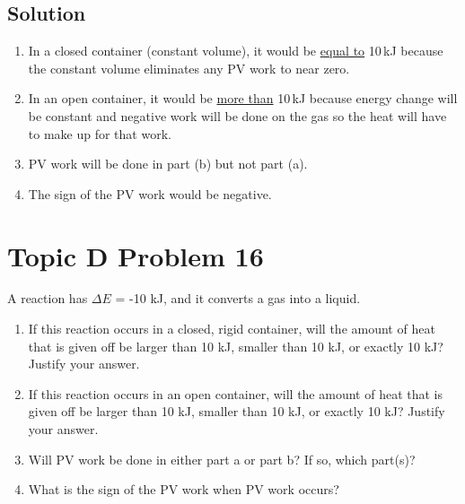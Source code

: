 \documentclass[10pt]{article}
\begin{document}
        \subsection{Solution}
        \begin{enumerate}[label=\alph*/]
            \item   In a closed container (constant volume), it would be \underline{equal to} 10\,\unit{\kilo\joule} because the constant volume eliminates any PV work to near zero.
            \item   In an open container, it would be \underline{more than} 10\,\unit{\kilo\joule} because energy change will be constant and negative work will be done on the gas so the heat will have to make up for that work.
            \item   PV work will be done in part (b) but not part (a).
            \item   The sign of the PV work would be negative. 
        \end{enumerate}

    \pagebreak
    \section{Topic D Problem 16}
        A reaction has $\Delta E$ = -10 kJ, and it converts a gas into a liquid.
        \begin{enumerate}[label=\alph*)]
            \item   If this reaction occurs in a closed, rigid container, will the amount of heat that is given off be larger than 10 kJ, smaller than 10 kJ, or exactly 10 kJ? Justify your answer.
            \item   If this reaction occurs in an open container, will the amount of heat that is given off be larger than 10 kJ, smaller than 10 kJ, or exactly 10 kJ? Justify your answer.
            \item   Will PV work be done in either part a or part b? If so, which part(s)?
            \item   What is the sign of the PV work when PV work occurs?
        \end{enumerate}
        
\end{document}
